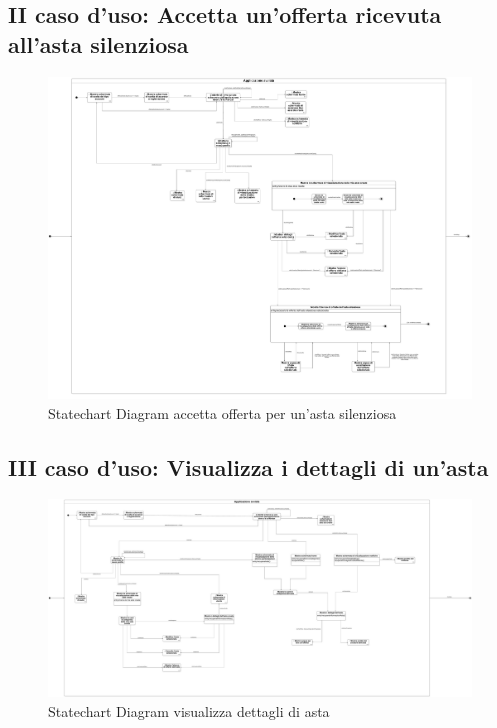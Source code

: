         \subsection{II caso d'uso: Accetta un'offerta ricevuta all'asta silenziosa}
            \begin{figure}[htbp!]
            \centering
                \includegraphics[width=1\linewidth]{Immagini/Diagrammi/Statechart Diagram/AccettaOffertaSilenziosa.pdf}
            \caption{Statechart Diagram accetta offerta per un'asta silenziosa}
            \end{figure}

        \clearpage

        \subsection{III caso d'uso: Visualizza i dettagli di un'asta}
            \begin{figure}[htbp!]
            \centering
                \includegraphics[width=1\linewidth]{Immagini/Diagrammi/Statechart Diagram/MostraDettagliAsta.pdf}
            \caption{Statechart Diagram visualizza dettagli di asta}
            \end{figure}

